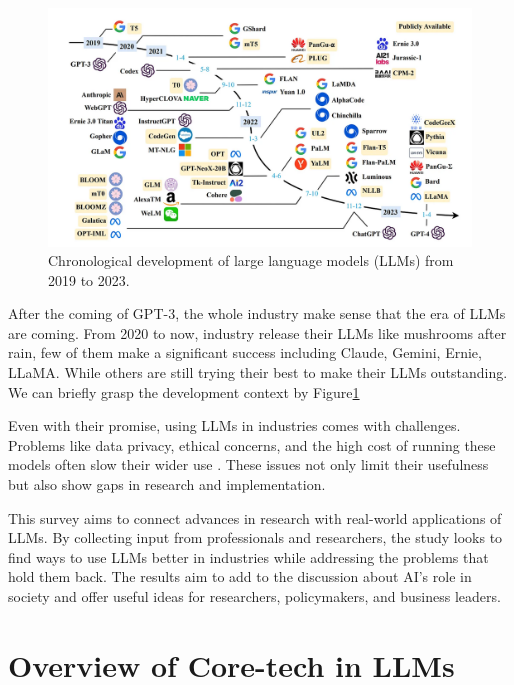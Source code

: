 \documentclass[fleqn,10pt]{SelfArx} %
\begin{document}
\begin{figure}[ht]\centering
	\includegraphics[width=\linewidth]{Figures/development.png}
	\caption{Chronological development of large language models (LLMs) from 2019 to 2023.\cite{zhao2024surveylargelanguagemodels}}
	\label{fig:dev}
\end{figure}

After the coming of GPT-3, the whole industry make sense that the era of LLMs are coming. From 2020 to now, industry release their LLMs like mushrooms after rain, few of them make a significant success including Claude, Gemini, Ernie, LLaMA. While others are still trying their best to make their LLMs outstanding. We can briefly grasp the development context by Figure\ref{fig:dev}

Even with their promise, using LLMs in industries comes with challenges. Problems like data privacy, ethical concerns, and the high cost of running these models often slow their wider use \cite{Bender:2021ai}. These issues not only limit their usefulness but also show gaps in research and implementation.

This survey aims to connect advances in research with real-world applications of LLMs. By collecting input from professionals and researchers, the study looks to find ways to use LLMs better in industries while addressing the problems that hold them back. The results aim to add to the discussion about AI’s role in society and offer useful ideas for researchers, policymakers, and business leaders.


\section{Overview of Core-tech in LLMs}
\end{document}
